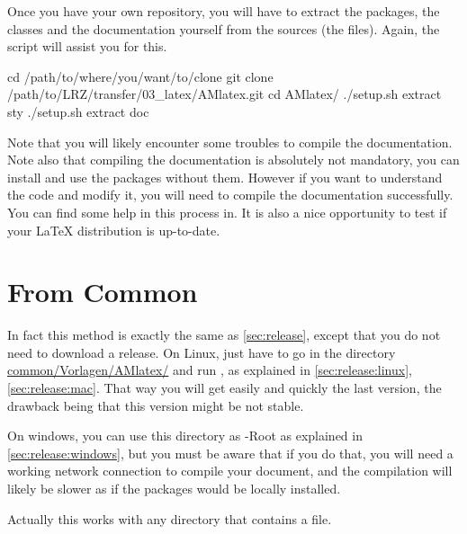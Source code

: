 \documentclass[12pt]{AMdocumentation}
\providecommand{\AMlatex}{AM-\LaTeX{}\xspace}
\begin{document}

Once you have your own repository, you will have to extract the packages, the classes and the documentation yourself from the sources (the  files). Again, the script  will assist you for this. 

\begin{bashshell}
cd /path/to/where/you/want/to/clone
git clone /path/to/LRZ/transfer/03_latex/AMlatex.git
cd AMlatex/
./setup.sh extract sty
./setup.sh extract doc
\end{bashshell}

Note that you will likely encounter some troubles to compile the documentation. Note also that compiling
the documentation is absolutely not mandatory, you can install and use the packages without them.
However if you want to understand the code and modify it, you will need to compile the documentation
successfully. You can find some help in this process in\cite{HOWTOdtx}. It is also a nice opportunity
to test if your \LaTeX{} distribution is up-to-date.


\section{From Common}
\label{sec:common}

In fact this method is exactly the same as \ref{sec:release}, except that you do not need to download a release. On Linux, just have to go in the directory \url{common/Vorlagen/AMlatex/} and run , as explained in \ref{sec:release:linux},\ref{sec:release:mac}. That way you will get easily and quickly the last version, the drawback being that this version might be not stable.

On windows, you can use this directory as \miktex-Root as explained in \ref{sec:release:windows}, but you must be aware that if you do that, you will need a working network connection to compile your document, and the compilation will likely be slower as if the packages would be locally installed.

\bigskip
Actually this works with any  directory that contains a  file.


\printbibliography
\end{document}

